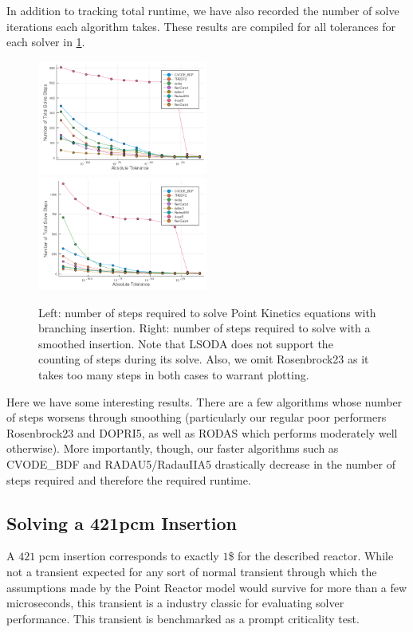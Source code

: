 \documentclass[review,onefignum,onetabnum]{siamart171218}
\begin{document}
In addition to tracking total runtime, we have also recorded the number of solve
iterations each algorithm takes. These results are compiled for all tolerances for
each solver in \cref{fig:num-steps}. \\

\begin{figure}[htb]
  \includegraphics[width=0.5\textwidth]{../plots/step-plots/stepinsert.png}
  \includegraphics[width=0.5\textwidth]{../plots/step-plots/tanhinserts.png}
  \caption{Left: number of steps required to solve Point Kinetics equations with
  branching insertion. Right: number of steps required to solve with a smoothed
  insertion. Note that LSODA does not support the counting of steps during
  its solve. Also, we omit Rosenbrock23 as it takes too many steps in both cases
  to warrant plotting.}
  \label{fig:num-steps}
\end{figure}

Here we have some interesting results. There are a few algorithms whose number of
steps worsens through smoothing (particularly our regular poor performers Rosenbrock23
and DOPRI5, as well as RODAS which performs moderately well otherwise).
More importantly, though, our faster algorithms such as CVODE\_BDF and
RADAU5/RadauIIA5 drastically decrease in the number of steps required and therefore
the required runtime.

\subsection{Solving a 421pcm Insertion}
A $421$ pcm insertion corresponds to exactly $1$\$ for the described reactor.
While not a transient expected for any sort of normal transient through which the
assumptions made by the Point Reactor model would survive for more than a few microseconds,
this transient is a industry classic for evaluating solver performance. This transient
is benchmarked as a prompt criticality test. \\
\end{document}
